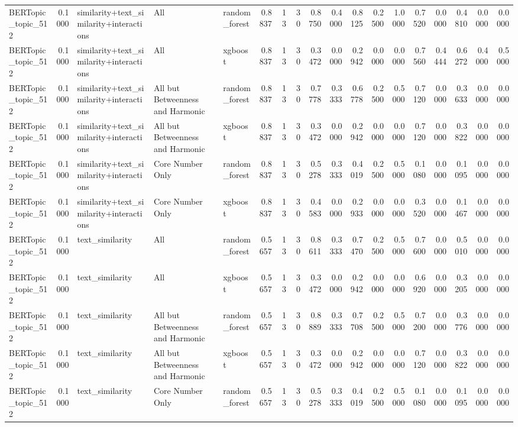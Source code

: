 \begin{tabular}{lrlllrrrrrrrrrrrrr}
BERTopic_topic_512 & 0.1000 & similarity+text_similarity+interactions & All & random_forest & 0.8837 & 13 & 30 & 0.8750 & 0.4000 & 0.8125 & 0.2500 & 1.0000 & 0.7520 & 0.0000 & 0.4810 & 0.0000 & 0.0000 \\
BERTopic_topic_512 & 0.1000 & similarity+text_similarity+interactions & All & xgboost & 0.8837 & 13 & 30 & 0.3472 & 0.0000 & 0.2942 & 0.0000 & 0.0000 & 0.7560 & 0.4444 & 0.6272 & 0.4000 & 0.5000 \\
BERTopic_topic_512 & 0.1000 & similarity+text_similarity+interactions & All but Betweenness and Harmonic & random_forest & 0.8837 & 13 & 30 & 0.7778 & 0.3333 & 0.6778 & 0.2500 & 0.5000 & 0.7120 & 0.0000 & 0.3633 & 0.0000 & 0.0000 \\
BERTopic_topic_512 & 0.1000 & similarity+text_similarity+interactions & All but Betweenness and Harmonic & xgboost & 0.8837 & 13 & 30 & 0.3472 & 0.0000 & 0.2942 & 0.0000 & 0.0000 & 0.7120 & 0.0000 & 0.3822 & 0.0000 & 0.0000 \\
BERTopic_topic_512 & 0.1000 & similarity+text_similarity+interactions & Core Number Only & random_forest & 0.8837 & 13 & 30 & 0.5278 & 0.3333 & 0.4019 & 0.2500 & 0.5000 & 0.1080 & 0.0000 & 0.1095 & 0.0000 & 0.0000 \\
BERTopic_topic_512 & 0.1000 & similarity+text_similarity+interactions & Core Number Only & xgboost & 0.8837 & 13 & 30 & 0.4583 & 0.0000 & 0.2933 & 0.0000 & 0.0000 & 0.3520 & 0.0000 & 0.1467 & 0.0000 & 0.0000 \\
BERTopic_topic_512 & 0.1000 & text_similarity & All & random_forest & 0.5657 & 13 & 30 & 0.8611 & 0.3333 & 0.7470 & 0.2500 & 0.5000 & 0.7600 & 0.0000 & 0.5010 & 0.0000 & 0.0000 \\
BERTopic_topic_512 & 0.1000 & text_similarity & All & xgboost & 0.5657 & 13 & 30 & 0.3472 & 0.0000 & 0.2942 & 0.0000 & 0.0000 & 0.6920 & 0.0000 & 0.3205 & 0.0000 & 0.0000 \\
BERTopic_topic_512 & 0.1000 & text_similarity & All but Betweenness and Harmonic & random_forest & 0.5657 & 13 & 30 & 0.8889 & 0.3333 & 0.7708 & 0.2500 & 0.5000 & 0.7200 & 0.0000 & 0.3776 & 0.0000 & 0.0000 \\
BERTopic_topic_512 & 0.1000 & text_similarity & All but Betweenness and Harmonic & xgboost & 0.5657 & 13 & 30 & 0.3472 & 0.0000 & 0.2942 & 0.0000 & 0.0000 & 0.7120 & 0.0000 & 0.3822 & 0.0000 & 0.0000 \\
BERTopic_topic_512 & 0.1000 & text_similarity & Core Number Only & random_forest & 0.5657 & 13 & 30 & 0.5278 & 0.3333 & 0.4019 & 0.2500 & 0.5000 & 0.1080 & 0.0000 & 0.1095 & 0.0000 & 0.0000 \\

\end{tabular}
